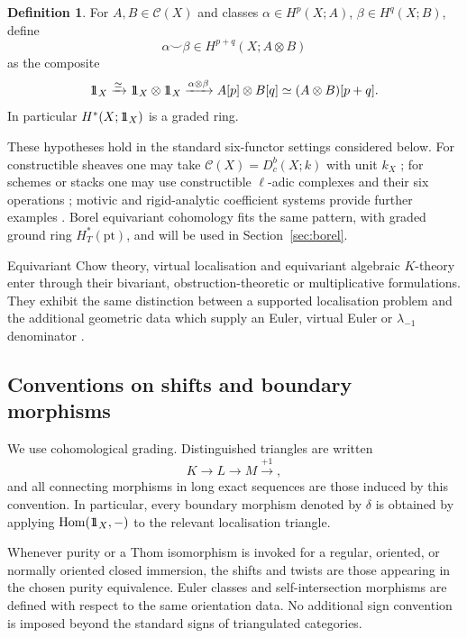 \documentclass[10pt,a4paper,dvipsnames,x11names]{amsart}
\newcommand{\one}{1\hskip-3.5pt1}
\newcommand{\C}{\mathcal C}
\newcommand{\pt}{\mathrm{pt}}
\newcommand{\Hom}{\mathrm{Hom}}
\numberwithin{equation}{section}
\theoremstyle{plain}
\theoremstyle{definition}
\newtheorem{definition}[definition]{Definition}
\theoremstyle{remark}
\begin{document}
\begin{definition} \label{def:cup}
For $A,B\in\C(X)$ and classes $\alpha\in H^p(X;A)$, $\beta\in H^q(X;B)$, define
$$
\alpha\smile\beta\in H^{p+q}(X;A\otimes B)
$$
as the composite
$$
\one_X \xrightarrow{\simeq} \one_X\otimes \one_X
\xrightarrow{\alpha\otimes\beta} A[p]\otimes B[q]
\simeq (A\otimes B)[p+q].
$$
In particular $H^*(X;\one_X)$ is a graded ring.
\end{definition}

 
These hypotheses hold in the standard six-functor settings considered below. For constructible sheaves one may take $\C(X)=D^b_c(X;k)$ with unit $k_X$ \cite{KS,BBD}; for schemes or stacks one may use constructible $\ell$-adic complexes and their six operations \cite{SGA4,BBD,LO1,LO2}; motivic and rigid-analytic coefficient systems provide further examples \cite{AyoubGallauerVezzaniRigidAnalyticMotives}. Borel equivariant cohomology fits the same pattern, with graded ground ring $H_T^*(\pt)$, and will be used in Section~\ref{sec:borel}.

Equivariant Chow theory, virtual localisation and equivariant algebraic $K$-theory enter through their bivariant, obstruction-theoretic or multiplicative formulations. They exhibit the same distinction between a supported localisation problem and the additional geometric data which supply an Euler, virtual Euler or $\lambda_{-1}$ denominator \cite{EG,GP,Thomason}.


\subsection{Conventions on shifts and boundary morphisms}\label{subsec:shift-sign-conventions}

We use cohomological grading.  Distinguished triangles are written
\[
K\longrightarrow L\longrightarrow M\xrightarrow{+1},
\]
and all connecting morphisms in long exact sequences are those induced by this convention.  In particular, every boundary morphism denoted by \(\delta\) is obtained by applying \(\Hom(\one_X,-)\) to the relevant localisation triangle.

Whenever purity or a Thom isomorphism is invoked for a regular, oriented, or normally oriented closed immersion, the shifts and twists are those appearing in the chosen purity equivalence.  Euler classes and self-intersection morphisms are defined with respect to the same orientation data.  No additional sign convention is imposed beyond the standard signs of triangulated categories.
\end{document}
